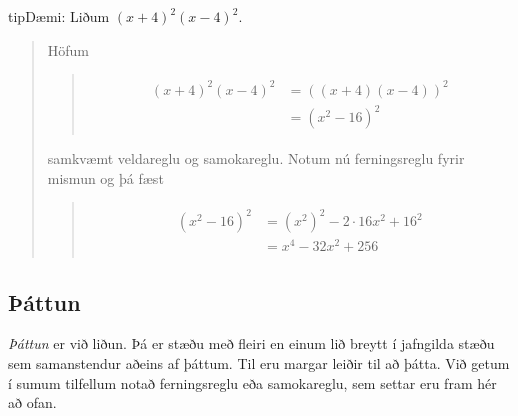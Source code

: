 \documentclass[a4paper,10pt,icelandic]{sphinxmanual}
\begin{document}
\begin{sphinxadmonition}{tip}{Dæmi:}
 Liðum \((x+4)^2(x-4)^2\).
\begin{quote}

Höfum
\begin{quote}
\begin{equation*}
\begin{split}\begin{aligned} (x+4)^2(x-4)^2 &= ((x+4)(x-4))^2\\ & = (x^2 - 16)^2 \end{aligned}\end{split}
\end{equation*}\end{quote}

samkvæmt veldareglu og samokareglu. Notum nú ferningsreglu fyrir mismun og þá fæst
\begin{quote}
\begin{equation*}
\begin{split}\begin{aligned} (x^2 - 16)^2 &=(x^2)^2 - 2 \cdot 16x^2 + 16^2\\ &=x^4-32x^2+256\end{aligned}\end{split}
\end{equation*}\end{quote}
\end{quote}
\end{sphinxadmonition}


\subsection{Þáttun}
\label{\detokenize{Kafli02:attun}}
\textit{Þáttun} er  við liðun. Þá er stæðu með fleiri en einum lið breytt í jafngilda stæðu sem samanstendur aðeins af þáttum.
Til eru margar leiðir til að þátta. Við getum í sumum tilfellum notað ferningsreglu eða samokareglu, sem settar eru fram hér að ofan.
\end{document}
